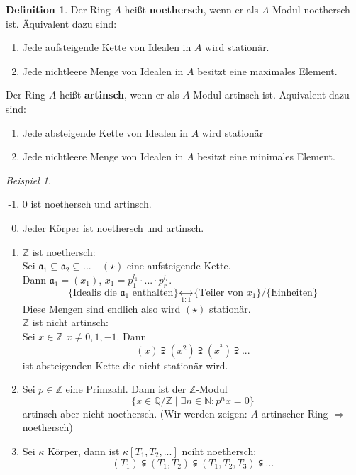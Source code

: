 \documentclass[10pt,a4paper]{article}
\newcommand{\N}{\ensuremath{\mathbb{N}}}
\newcommand{\Z}{\ensuremath{\mathbb{Z}}}
\newcommand{\Q}{\ensuremath{\mathbb{Q}}}
\newcounter{thm}[section]
\theoremstyle{definition}
\newtheorem{definition}[thm]{Definition}
\theoremstyle{plain}
\theoremstyle{remark}
\newtheorem{exm}[thm]{Beispiel}
\begin{document}
\begin{definition}
	Der Ring $A$ heißt \textbf{noethersch}, wenn er als $A$-Modul noethersch ist.
	Äquivalent dazu sind:
	\begin{enumerate}
		\item Jede aufsteigende Kette von Idealen in $A$ wird stationär.
		\item Jede nichtleere Menge von Idealen in $A$ besitzt eine maximales Element.
	\end{enumerate}
	Der Ring $A$ heißt \textbf{artinsch}, wenn er als $A$-Modul artinsch ist.
	Äquivalent dazu sind:
	\begin{enumerate}
		\item Jede absteigende Kette von Idealen in $A$ wird stationär
		\item Jede nichtleere Menge von Idealen in $A$ besitzt eine minimales Element.
	\end{enumerate}
\end{definition}
\begin{exm}
	\begin{enumerate}
		\setcounter{enumi}{-2}
		\item $0$  ist noethersch und artinsch.
		\item Jeder Körper ist noethersch und artinsch.
		\item $\Z$ ist noethersch:\\
		Sei $\mathfrak a_1\subseteq \mathfrak a_2\subseteq...\quad (\star)$ eine aufsteigende Kette. \\
		Dann $\mathfrak a_1=(x_1)$, $x_1=p_1^{l_1}\cdot...\cdot p_r^{l_r}$.
		\[\{\text{Idealis die $\mathfrak a_1$ enthalten}\}\underset{1:1}{\leftrightarrow}\{\text{Teiler von $x_1$}\}/\{\text{Einheiten}\}\]
		Diese Mengen sind endlich also wird $(\star)$ stationär.\\
		$\Z$ ist nicht artinsch:\\
		Sei $x\in\Z$ $x\neq 0,1,-1$. Dann\\
		\[(x)\supsetneqq(x^2)\supsetneqq(x^^3)\supsetneqq...\]
		ist absteigenden Kette die nicht stationär wird.
		\item Sei $p\in\Z$ eine Primzahl. Dann ist der $\Z$-Modul
		\[\{x\in\Q/\Z\mid \exists n\in\N:p^nx=0\}\]
		artinsch aber nicht noethersch.
		(Wir werden zeigen: $A$ artinscher Ring $\Rightarrow$ noethersch)
		\item Sei $\kappa$ Körper, dann ist $\kappa[T_1,T_2,...]$ nciht noethersch:
		\[(T_1)\subsetneqq(T_1,T_2)\subsetneqq(T_1,T_2,T_3)\subsetneqq...\]
	\end{enumerate}
\end{exm}
\end{document}
